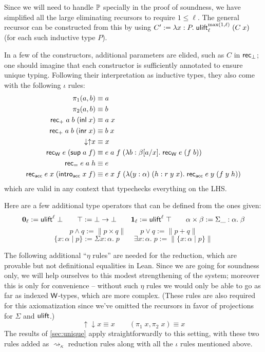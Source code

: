 Since we will need to handle $\P$ specially in the proof of soundness, we have simplified all the large eliminating recursors to require $1\le\ell$. The general recursor can be constructed from this by using $C':=\lambda x:P.\;\ulift_{\ell}^{\max(1,\ell)}\;(C\;x)$ (for each such inductive type $P$).

In a few of the constructors, additional parameters are elided, such as $C$ in $\rec_\bot$; one should imagine that each constructor is sufficiently annotated to ensure unique typing. Following their interpretation as inductive types, they also come with the following $\iota$ rules:
\begin{align*}
\pi_1(a,b)&\equiv a\\
\pi_2(a,b)&\equiv b\\
\rec_+\;a\;b\;(\inl x)&\equiv a\;x\\
\rec_+\;a\;b\;(\inr x)&\equiv b\;x\\
{\downarrow\uparrow} x&\equiv x\\
\rec_\W\;e\;(\sup a\;f)&\equiv e\;a\;f\;(\lambda b:\beta[a/x].\;\rec_\W\;e\;(f\;b))\\
\rec_=\;e\;a\;h&\equiv e\\
\rec_\acc\;e\;x\;(\intro_\acc\;x\;f)&\equiv e\;x\;f\;(\lambda (y:\alpha)\;(h:r\;y\;x).\;\rec_\acc\;e\;y\;(f\;y\;h))
\end{align*}
which are valid in any context that typechecks everything on the LHS.

Here are a few additional type operators that can be defined from the ones given:
$${\bf 0}_\ell:=\ulift^\ell\;\bot\qquad\top:=\bot\to\bot\qquad{\bf 1}_\ell:=\ulift^\ell\;\top\qquad \alpha\times \beta:=\Sigma\_:\alpha.\;\beta$$
$$p\land q:=\|p\times q\|\qquad p\lor q:=\|p+q\|$$
$$\{x:\alpha\mid p\}:=\Sigma x:\alpha.\;p\qquad
\exists x:\alpha.\; p:=\|\{x:\alpha\mid p\}\|$$

The following additional ``$\eta$ rules'' are needed for the reduction, which are provable but not definitional equalities in Lean. Since we are going for soundness only, we will help ourselves to this modest strengthening of the system; moreover this is only for convenience -- without such $\eta$ rules we would only be able to go as far as indexed $\W$-types, which are more complex. (These rules are also required for this axiomatization since we've omitted the recursors in favor of projections for $\Sigma$ and $\ulift$.)
$${\uparrow\downarrow} x\equiv x\qquad (\pi_1\;x,\pi_2\;x)\equiv x$$
The results of \autoref{sec:unique} apply straightforwardly to this setting, with these two rules added as $\rightsquigarrow_\kappa$ reduction rules along with all the $\iota$ rules mentioned above.
%
